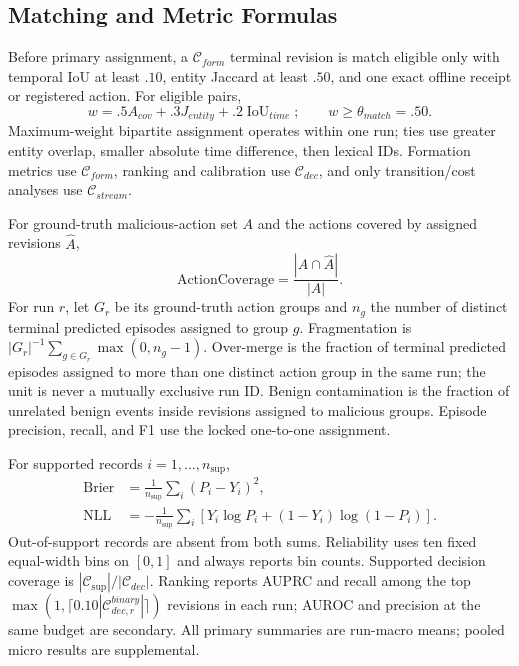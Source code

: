 \subsection{Matching and Metric Formulas}

Before primary assignment, a $\mathcal C_{form}$ terminal revision is match eligible only with
temporal IoU at least $.10$, entity Jaccard at least $.50$, and one exact offline receipt or registered
action. For eligible pairs,
\begin{equation}
w=.5A_{cov}+.3J_{entity}+.2\operatorname{IoU}_{time};\qquad
w\ge\theta_{match}=.50.
\end{equation}
Maximum-weight bipartite assignment operates within one run; ties use greater entity overlap,
smaller absolute time difference, then lexical IDs. Formation metrics use $\mathcal C_{form}$,
ranking and calibration use $\mathcal C_{dec}$, and only transition/cost analyses use
$\mathcal C_{stream}$.

For ground-truth malicious-action set $A$ and the actions covered by assigned revisions
$\widehat A$,
\begin{equation}
\mathrm{ActionCoverage}=\frac{|A\cap\widehat A|}{|A|}.
\end{equation}
For run $r$, let $G_r$ be its ground-truth action groups and $n_g$ the number of distinct
terminal predicted episodes assigned to group $g$. Fragmentation is
$|G_r|^{-1}\sum_{g\in G_r}\max(0,n_g-1)$. Over-merge is the fraction of terminal predicted
episodes assigned to more than one distinct action group in the same run; the unit is never a
mutually exclusive run ID. Benign contamination is the fraction of unrelated benign events
inside revisions assigned to malicious groups. Episode precision, recall, and F1 use the
locked one-to-one assignment.

For supported records $i=1,\ldots,n_{\mathrm{sup}}$,
\begin{align}
\mathrm{Brier}&=\frac{1}{n_{\mathrm{sup}}}\sum_i(P_i-Y_i)^2,\\
\mathrm{NLL}&=-\frac{1}{n_{\mathrm{sup}}}\sum_i
[Y_i\log P_i+(1-Y_i)\log(1-P_i)].
\end{align}
Out-of-support records are absent from both sums. Reliability uses ten fixed equal-width bins
on $[0,1]$ and always reports bin counts. Supported decision coverage is
$|\mathcal C_{\mathrm{sup}}|/|\mathcal C_{dec}|$. Ranking reports AUPRC and recall among the
top $\max(1,\lceil0.10|\mathcal C_{dec,r}^{binary}|\rceil)$ revisions in each run; AUROC and precision
at the same budget are secondary. All primary summaries are run-macro means; pooled micro
results are supplemental.

